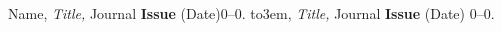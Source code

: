 {\def\bysame{\leavevmode\hbox 
to3em{\hrulefill}\thinspace}\newcommand{\NUMBERRRR}{\#}\newcommand{\PAGESS}{}
\begin{thebibliography}{99}
 Name, \emph{Title,} Journal {\bf Issue} (Date)\PAGESS{}0--0.
 \bysame, \emph{Title,} Journal {\bf Issue} (Date) \PAGESS{}0--0.
\end{thebibliography}}